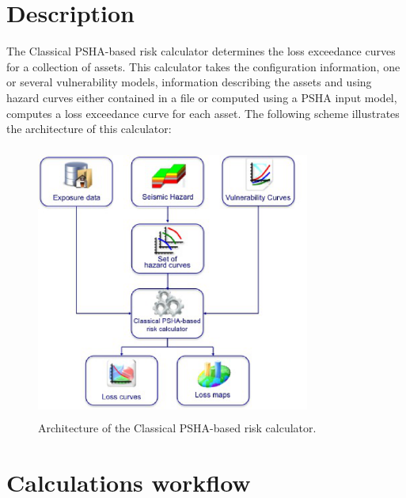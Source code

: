 \section{Description}
The Classical PSHA-based risk calculator determines the loss exceedance curves for a collection of assets. This calculator takes the configuration information, one or several vulnerability models, information describing the assets and using hazard curves either contained in a file or computed using a PSHA input model, computes a loss exceedance curve for each asset. The following scheme illustrates the architecture of this calculator:

\begin{figure}[ht]
\centering
\includegraphics[width=9cm,height=9cm]{./Figures/Part_Risk/Scheme_PSHA_calc.eps}
\caption{Architecture of the Classical PSHA-based risk calculator.}
\label{fig:Scheme_PSHA_calc}
\end{figure}

\section{Calculations workflow}

